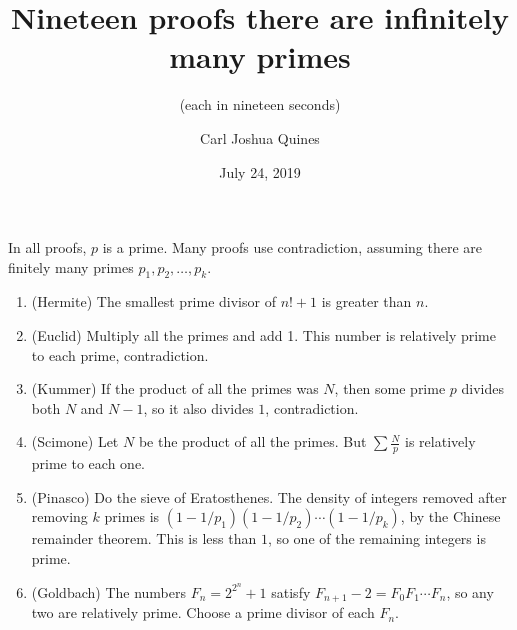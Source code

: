 \documentclass[11pt,paper=letter]{scrartcl}
\begin{document}
\title{Nineteen proofs there are infinitely many primes}
\subtitle{(each in nineteen seconds)}
\author{Carl Joshua Quines}
\date{July 24, 2019}

\maketitle

In all proofs, $p$ is a prime. Many proofs use contradiction, assuming there are finitely many primes $p_1, p_2, \ldots, p_k$.

\begin{enumerate}

\item (Hermite) The smallest prime divisor of $n! + 1$ is greater than $n$.

\item (Euclid) Multiply all the primes and add 1. This number is relatively prime to each prime, contradiction.

\item (Kummer) If the product of all the primes was $N$, then some prime $p$ divides both $N$ and $N-1$, so it also divides $1$, contradiction.

\item (Scimone) Let $N$ be the product of all the primes. But $\sum \frac Np$ is relatively prime to each one.



\item (Pinasco) Do the sieve of Eratosthenes. The density of integers removed after removing $k$ primes is $(1 - 1/p_1)(1 - 1/p_2)\cdots(1 - 1/p_k)$, by the Chinese remainder theorem. This is less than $1$, so one of the remaining integers is prime.

\item (Goldbach) The numbers $F_n = 2^{2^n} + 1$ satisfy $F_{n+1} - 2 = F_0F_1 \cdots F_n$, so any two are relatively prime. Choose a prime divisor of each $F_n$.


\end{enumerate}
\end{document}
